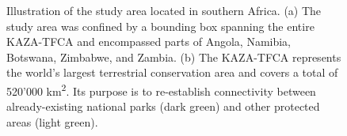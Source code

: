 \documentclass[abstract=on,10pt,a4paper,bibliography=totocnumbered]{article}
\begin{document}
\begin{figure}[h]
  \begin{center}
    \caption{Illustration of the study area located in southern Africa. (a) The
    study area was confined by a bounding box spanning the entire KAZA-TFCA and
    encompassed parts of Angola, Namibia, Botswana, Zimbabwe, and Zambia. (b)
    The KAZA-TFCA represents the world's largest terrestrial conservation area
    and covers a total of 520'000 km\textsuperscript{2}. Its purpose is to
    re-establish connectivity between already-existing national parks (dark
    green) and other protected areas (light green).}
    \label{StudyArea}
  \end{center}
\end{figure}
\end{document}

